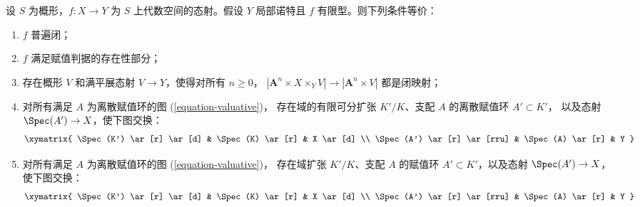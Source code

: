 \begin{lemma}
\label{lemma-check-universally-closed-Noetherian}
设 $S$ 为概形，$f : X \to Y$ 为 $S$ 上代数空间的态射。假设 $Y$ 局部诺特且
$f$ 有限型。则下列条件等价：
\begin{enumerate}
\item $f$ 普遍闭；
\item $f$ 满足赋值判据的存在性部分；
\item 存在概形 $V$ 和满平展态射 $V \to Y$，使得对所有 $n \geq 0$，
$|\mathbf{A}^n \times X \times_Y V| \to |\mathbf{A}^n \times V|$ 都是闭映射；
\item 对所有满足 $A$ 为离散赋值环的图 (\ref{equation-valuative})，
存在域的有限可分扩张 $K'/K$、支配 $A$ 的离散赋值环 $A' \subset K'$，
以及态射 $\Spec(A') \to X$，使下图交换：
$$
\xymatrix{
\Spec(K') \ar[r] \ar[d] & \Spec(K) \ar[r] & X \ar[d] \\
\Spec(A') \ar[r] \ar[rru] & \Spec(A) \ar[r] & Y
}
$$
\item 对所有满足 $A$ 为离散赋值环的图 (\ref{equation-valuative})，
存在域扩张 $K'/K$、支配 $A$ 的赋值环 $A' \subset K'$，以及态射
$\Spec(A') \to X$，使下图交换：
$$
\xymatrix{
\Spec(K') \ar[r] \ar[d] & \Spec(K) \ar[r] & X \ar[d] \\
\Spec(A') \ar[r] \ar[rru] & \Spec(A) \ar[r] & Y
}
$$
\end{enumerate}
\end{lemma}

